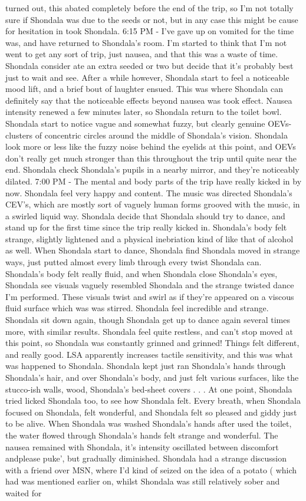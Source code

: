 \documentclass[12pt]{book}
\begin{document}
turned out, this abated completely before the end of the trip, so I'm not totally sure if Shondala was due to the seeds or not, but in any case this might be cause for hesitation in took Shondala. 6:15 PM - I've gave up on vomited for the time was, and have returned to Shondala's room. I'm started to think that I'm not went to get any sort of trip, just nausea, and that this was a waste of time. Shondala consider ate an extra seeded or two but decide that it's probably best just to wait and see. After a while however, Shondala start to feel a noticeable mood lift, and a brief bout of laughter ensued. This was where Shondala can definitely say that the noticeable effects beyond nausea was took effect. Nausea intensity renewed a few minutes later, so Shondala return to the toilet bowl. Shondala start to notice vague and somewhat fuzzy, but clearly genuine OEVs- clusters of concentric circles around the middle of Shondala's vision. Shondala look more or less like the fuzzy noise behind the eyelids at this point, and OEVs don't really get much stronger than this throughout the trip until quite near the end. Shondala check Shondala's pupils in a nearby mirror, and they're noticeably dilated. 7:00 PM - The mental and body parts of the trip have really kicked in by now. Shondala feel very happy and content. The music was directed Shondala's CEV's, which are mostly sort of vaguely human forms grooved with the music, in a swirled liquid way. Shondala decide that Shondala should try to dance, and stand up for the first time since the trip really kicked in. Shondala's body felt strange, slightly lightened and a physical inebriation kind of like that of alcohol as well. When Shondala start to dance, Shondala find Shondala moved in strange ways, just putted almost every limb through every twist Shondala can. Shondala's body felt really fluid, and when Shondala close Shondala's eyes, Shondala see visuals vaguely resembled Shondala and the strange twisted dance I'm performed. These visuals twist and swirl as if they're appeared on a viscous fluid surface which was was stirred. Shondala feel incredible and strange. Shondala sit down again, though Shondala get up to dance again several times more, with similar results. Shondala feel quite restless, and can't stop moved at this point, so Shondala was constantly grinned and grinned! Things felt different, and really good. LSA apparently increases tactile sensitivity, and this was what was happened to Shondala. Shondala kept just ran Shondala's hands through Shondala's hair, and over Shondala's body, and just felt various surfaces, like the stucco-ish walls, wood, Shondala's bed-sheet covers . . .  At one point, Shondala tried licked Shondala too, to see how Shondala felt. Every breath, when Shondala focused on Shondala, felt wonderful, and Shondala felt so pleased and giddy just to be alive. When Shondala was washed Shondala's hands after used the toilet, the water flowed through Shondala's hands felt strange and wonderful. The nausea remained with Shondala, it's intensity oscillated between discomfort andplease puke', but gradually diminished. Shondala had a strange discussion with a friend over MSN, where I'd kind of seized on the idea of a potato ( which had was mentioned earlier on, whilst Shondala was still relatively sober and waited for 
\end{document}
